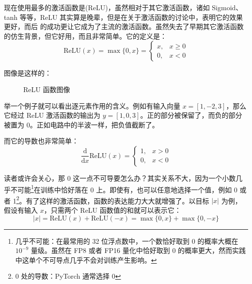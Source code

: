 现在使用最多的激活函数是(ReLU)，虽然相对于其它激活函数，诸如 Sigmoid、tanh 等等，ReLU 其实算是晚辈，但是在关于激活函数的讨论中，表明它的效果更好，而后 的成功更让它成为了主流的激活函数。虽然失去了早期其它激活函数的仿生背景，但它好用，而且非常简单。它的定义是：
\[
    \text{ReLU}(x) = \max\{0, x\} = \begin{cases}
        x, & x \geq 0 \\
        0, & x < 0
    \end{cases}
\]

图像是这样的：
\begin{figure}[H]
    \centering
    \caption{ReLU 函数图像}
\end{figure}

举一个例子就可以看出逐元素作用的含义。例如有输入向量 $x = [1, -2, 3]$，那么它经过 ReLU 激活函数的输出为 $y = [1, 0, 3]$。正的部分被保留了，而负的部分被置为 0。正如电路中的半波一样，把负值截断了。

而它的导数也非常简单：
\[
    \frac{\mathrm{d}}{\mathrm{d} x}\text{ReLU}(x) = \begin{cases}
        1, & x > 0 \\
        0, & x < 0
    \end{cases}
\]

读者或许会关心，那 0 这一点不可导要怎么办？其实关系不大，因为一个小数几乎不可能\footnote{几乎不可能：在最常用的 32 位浮点数中，一个数恰好取到 0 的概率大概在 $10^{-9}$ 量级。虽然在 FP8 或者 FP16 量化中恰好取到 0 的概率更大，然而实践中这单个不可导点几乎不会对训练产生影响。}在训练中恰好落在 0 上。即使有，也可以任意地选择一个值，例如 0 或者 1\footnote{0 处的导数：PyTorch 通常选择 0}。有了这样的激活函数，函数的表达能力大大就增强了。以目标 $|x|$ 为例，假设有输入 $x$，只需两个 ReLU 函数值的和就可以表示它：
\[
    |x| = \text{ReLU}(x) + \text{ReLU}(-x) = \max\{0, x\} + \max\{0, -x\}
\]

